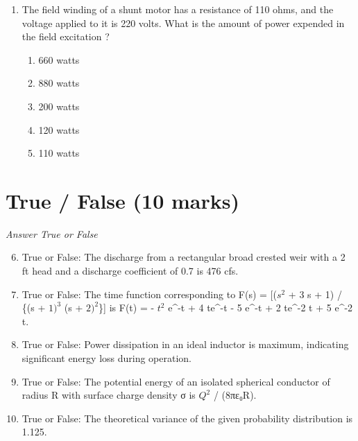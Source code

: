 \documentclass[12pt]{article}
\begin{document}
\begin{enumerate}[label=\arabic*.]
\begin{enumerate}[label=(\alph*)]
    \item 3/2
    \item 1/4
    \item 0
    \item 1/5
    \item 1/3
\end{enumerate}
\item The field winding of a shunt motor has a resistance of 110 ohms, and the voltage applied to it is 220 volts. What is the amount of power expended in the field excitation ?
\begin{enumerate}[label=(\alph*)]
    \item 660 watts
    \item 880 watts
    \item 200 watts
    \item 120 watts
    \item 110 watts
\end{enumerate}
\end{enumerate}

\section*{True / False (10 marks)}
\textit{Answer True or False}
\begin{enumerate}[label=\arabic*.]
\setcounter{enumi}{5}
\item True or False: The discharge from a rectangular broad crested weir with a 2 ft head and a discharge coefficient of 0.7 is 476 cfs.
\item True or False: The time function corresponding to F(s) = [($s^2$ + 3 s + 1) / \{(s + $1)^3$ (s + $2)^2$\}] is F(t) = - $t^2$ e^-t + 4 te^-t - 5 e^-t + 2 te^-2 t + 5 e^-2 t.
\item True or False: Power dissipation in an ideal inductor is maximum, indicating significant energy loss during operation.
\item True or False: The potential energy of an isolated spherical conductor of radius R with surface charge density σ is $Q^2$ / (8πε₀R).
\item True or False: The theoretical variance of the given probability distribution is 1.125.
\end{enumerate}
\end{document}
